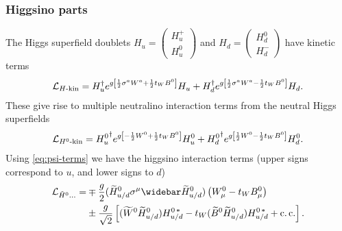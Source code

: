 \documentclass[english, notitlepage]{article}
\begin{document}
        \subsubsection{Higgsino parts}
            The Higgs superfield doublets $H_u = \begin{pmatrix} H_u^+ \\ H_u^0 \end{pmatrix}$ and $H_d = \begin{pmatrix} H_d^0 \\ H_d^- \end{pmatrix}$ have kinetic terms
            \begin{align}
                \mathcal{L}_{H\text{-kin}} = H_u^\dag e^{g\left[\frac{1}{2}\sigma^a W^a + \frac{1}{2}t_W B^0\right]} H_u + H_d^\dag e^{g\left[\frac{1}{2}\sigma^a W^a - \frac{1}{2}t_WB^0\right]} H_d.
            \end{align}
            These give rise to multiple neutralino interaction terms from the neutral Higgs superfields
            \begin{align}
                \mathcal{L}_{H^0\text{-kin}} = {H_u^0}^\dag e^{g\left[-\frac{1}{2}W^0 + \frac{1}{2}t_W B^0\right]} H_u^0 + {H_d^0}^\dag e^{g\left[\frac{1}{2}W^0 - \frac{1}{2}t_W B^0\right]} H_d^0.
            \end{align}
            Using \cref{eq:psi-terms} we have the higgsino interaction terms (upper signs correspond to $u$, and lower signs to $d$)
            \begin{align} \nonumber
                \L_{\tilde{H}^0\ldots} = & \mp \frac{g}{2} (\wtilde{H}^0_{u/d} \sigma^\mu \wbar{\wtilde{H}}^0_{u/d})\pclosed{W^0_\mu - t_W B^0_\mu}                                        \\
                                         & \pm \frac{g}{\sqrt{2}} \bclosed{(\wtilde{W}^0 \wtilde{H}^0_{u/d}) H^{0\,*}_{u/d} - t_W (\wtilde{B}^0 \wtilde{H}^0_{u/d}) H^{0\,*}_{u/d} + \cc}.
            \end{align}
\end{document}
